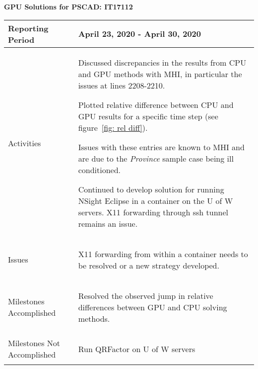 \documentclass[11pt,letterpaper]{article}
\begin{document}
\vspace{.2in}
\begin{center}
    {\bf GPU Solutions for PSCAD: IT17112}
\end{center}

	\vspace{.25in}

\begin{tabular}{| p{} | p{} |}
	\hline
	Reporting Period & April 23, 2020 - April 30, 2020 \\ \hline

	Activities & \begin{enumerate*}
	\item[\tiny\textbullet] Discussed discrepancies in the results from CPU and GPU methods with MHI, in particular the issues at lines 2208-2210. \newline
  \item[\tiny\textbullet] Plotted relative difference between CPU and GPU results for a specific time step (see figure~\ref{fig: rel diff}). \newline
  \item[\tiny\textbullet] Issues with these entries are known to MHI and are due to the \emph{Province} sample case being ill conditioned. \newline
  \item[\tiny\textbullet] Continued to develop solution for running NSight Eclipse in a container on the U of W servers. X11 forwarding through ssh tunnel remains an issue. \newline
	\end{enumerate*} \\ \hline

	Issues & \begin{enumerate*}
	\item[\tiny\textbullet] X11 forwarding from within a container needs to be resolved or a new strategy developed.
	\end{enumerate*} \\ \hline

	Milestones \newline Accomplished & \begin{enumerate*}
	\item[\tiny\textbullet] Resolved the observed jump in relative differences between GPU and CPU solving methods.
  \end{enumerate*} \\ \hline

	Milestones Not \newline Accomplished & \begin{enumerate*}
	\item[\tiny\textbullet] Run QRFactor on U of W servers
	\end{enumerate*} \\ \hline


\end{tabular}
\end{document}
